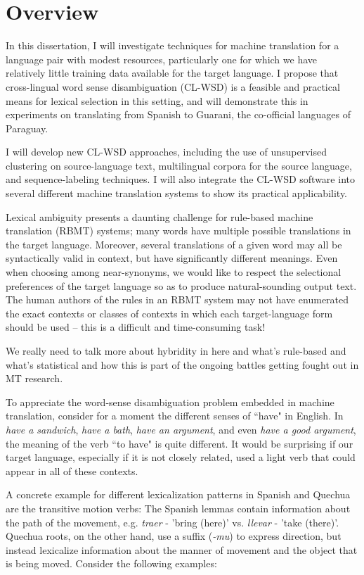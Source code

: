 \chapter{Overview}
In this dissertation, I will investigate techniques for machine translation for
a language pair with modest resources, particularly one for which we have
relatively little training data available for the target language.  I propose
that cross-lingual word sense disambiguation (CL-WSD) is a feasible and
practical means for lexical selection in this setting, and will demonstrate
this in experiments on translating from Spanish to Guarani, the co-official
languages of Paraguay.

I will develop new CL-WSD approaches, including the use of unsupervised
clustering on source-language text, multilingual corpora for the source
language, and sequence-labeling techniques. I will also integrate the CL-WSD
software into several different machine translation systems to show its
practical applicability.

Lexical ambiguity presents a daunting challenge for rule-based machine
translation (RBMT) systems;
many words have multiple possible translations in the target language.
Moreover, several translations of a given word may all be syntactically valid
in context, but have significantly different meanings. Even when choosing among
near-synonyms, we would like to respect the selectional preferences of the
target language so as to produce natural-sounding output text.  The human
authors of the rules in an RBMT system may not have enumerated the exact
contexts or classes of contexts in which each target-language form should be
used -- this is a difficult and time-consuming task!

We really need to talk more about hybridity in here and what's rule-based and
what's statistical and how this is part of the ongoing battles getting fought
out in MT research.



To appreciate the word-sense disambiguation problem embedded in machine
translation, consider for a moment the different senses of ``have" in
English. In \emph{have a sandwich}, \emph{have a bath}, \emph{have an
argument}, and even \emph{have a good argument}, the meaning of the verb ``to
have" is quite different. It would be surprising if our target language,
especially if it is not closely related, used a light verb that could appear in
all of these contexts.

A concrete example for different lexicalization patterns in Spanish and Quechua
are the transitive motion verbs: The Spanish lemmas contain information about
the path of the movement, e.g. {\em traer} - 'bring (here)' vs. {\em llevar} -
'take (there)'. Quechua roots, on the other hand, use a suffix ({\em -mu}) to
express direction, but instead lexicalize information about the manner of
movement and the object that is being moved. Consider the following examples:


